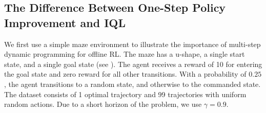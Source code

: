 \documentclass{article} %
\def\ourname{IQL\xspace}
\begin{document}
\vspace{-0.2cm}
\subsection{The Difference Between One-Step Policy Improvement and \ourname}
\label{sec:example}
\vspace{-0.2cm}


We first use a simple maze environment to illustrate the importance of multi-step dynamic programming for offline RL.
The maze has a u-shape, a single start state, and a single goal state (see ).
The agent receives a reward of 10 for entering the goal state and zero reward for all other transitions. With a probability of $0.25$, the agent transitions to a random state, and otherwise to the commanded state.
The dataset consists of 1 optimal trajectory and 99 trajectories with uniform random actions.
Due to a short horizon of the problem, we use $\gamma=0.9$.
\end{document}
